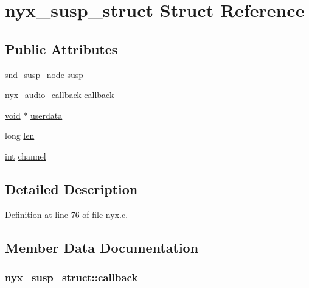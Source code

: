 \hypertarget{structnyx__susp__struct}{}\section{nyx\+\_\+susp\+\_\+struct Struct Reference}
\label{structnyx__susp__struct}
\subsection*{Public Attributes}
\begin{DoxyCompactItemize}
\item 
\hyperlink{sound_8h_a6b268203688a934bd798ceb55f85d4c0}{snd\+\_\+susp\+\_\+node} \hyperlink{structnyx__susp__struct_a8a4e09c7e609ac7f9b174c0855ce1834}{susp}
\item 
\hyperlink{nyx_8h_a7e137367de7c5b283edab8f2e8b7bb42}{nyx\+\_\+audio\+\_\+callback} \hyperlink{structnyx__susp__struct_ac3de91fc57a3872629894ad3dbaa9a10}{callback}
\item 
\hyperlink{sound_8c_ae35f5844602719cf66324f4de2a658b3}{void} $\ast$ \hyperlink{structnyx__susp__struct_ae57b1688bbc6968f57cea4112e8b01f3}{userdata}
\item 
long \hyperlink{structnyx__susp__struct_aa3e884a8cc118e30638119472dd18e83}{len}
\item 
\hyperlink{xmltok_8h_a5a0d4a5641ce434f1d23533f2b2e6653}{int} \hyperlink{structnyx__susp__struct_a20d9b59231ed82e68ca4afe0b2d6700c}{channel}
\end{DoxyCompactItemize}


\subsection{Detailed Description}


Definition at line 76 of file nyx.\+c.



\subsection{Member Data Documentation}
\subsubsection[{\texorpdfstring{callback}{callback}}]{ nyx\+\_\+susp\+\_\+struct\+::callback}\hypertarget{structnyx__susp__struct_ac3de91fc57a3872629894ad3dbaa9a10}{}\label{structnyx__susp__struct_ac3de91fc57a3872629894ad3dbaa9a10}


